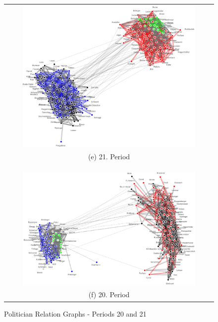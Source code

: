\begin{figure}
\center
\begin{tabular}{ c }
	\includegraphics[width=0.85\textwidth]{imgs/graphs/politician-graphs/horizontal/graph_21.eps}
	\\
	(e) 21. Period
	\\
	
	\\
	\hline
	\\
	\\ \includegraphics[width=0.85\textwidth]{imgs/graphs/politician-graphs/horizontal/graph_20.eps}
	\\
	(f) 20. Period
	
\end{tabular}
	
	
	\caption{Politician Relation Graphs - Periods 20 and 21}
	\label{fig:pol_graphs_20_21}
\end{figure}